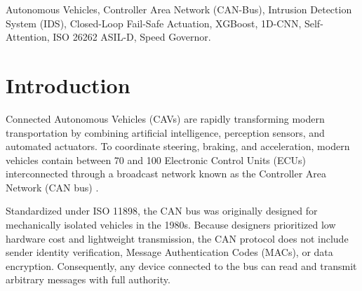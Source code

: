 \documentclass[conference]{IEEEtran}
\begin{document}
\begin{IEEEkeywords}
Autonomous Vehicles, Controller Area Network (CAN-Bus), Intrusion Detection System (IDS), Closed-Loop Fail-Safe Actuation, XGBoost, 1D-CNN, Self-Attention, ISO 26262 ASIL-D, Speed Governor.
\end{IEEEkeywords}

\section{Introduction}
Connected Autonomous Vehicles (CAVs) are rapidly transforming modern transportation by combining artificial intelligence, perception sensors, and automated actuators. To coordinate steering, braking, and acceleration, modern vehicles contain between 70 and 100 Electronic Control Units (ECUs) interconnected through a broadcast network known as the Controller Area Network (CAN bus) \cite{koscher2010experimental}.

Standardized under ISO 11898, the CAN bus was originally designed for mechanically isolated vehicles in the 1980s. Because designers prioritized low hardware cost and lightweight transmission, the CAN protocol does not include sender identity verification, Message Authentication Codes (MACs), or data encryption. Consequently, any device connected to the bus can read and transmit arbitrary messages with full authority.
\end{document}
